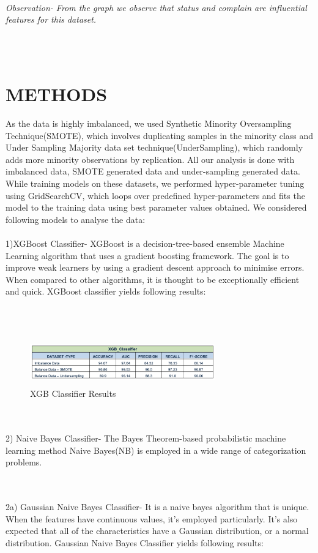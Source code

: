 \documentclass[a4paper, 10pt, conference]{ieeeconf}      %
\begin{document}
\\\textit{Observation- From the graph we observe that status and complain are influential features for this dataset.}

\\\
\section{\textbf{METHODS}}
As the data is highly imbalanced, we used Synthetic Minority Oversampling Technique(SMOTE), which involves duplicating samples in the minority class and Under Sampling Majority data set technique(UnderSampling), which randomly adds more minority observations by replication.
All our analysis is done with imbalanced data, SMOTE generated data and under-sampling generated data. While training models on these datasets, we performed hyper-parameter tuning using GridSearchCV, which loops over predefined hyper-parameters and fits the model to the training data using best parameter values obtained.
We considered following models to analyse the data:
\\\
\\1)XGBoost Classifier-
XGBoost is a decision-tree-based ensemble Machine Learning algorithm that uses a gradient boosting framework. The goal is to improve weak learners by using a gradient descent approach to minimise errors. When compared to other algorithms, it is thought to be exceptionally efficient and quick. 
XGBoost classifier yields following results:

\\\
\begin{figure}[htp]
    \centering
    \includegraphics[width=8cm,height=2cm]{Images/xgbclassifier.png}
    \caption{XGB Classifier Results}
    \label{fig:xgbclassifier}
\end{figure}
\\\
\\2) Naive Bayes Classifier- The Bayes Theorem-based probabilistic machine learning method Naive Bayes(NB) is employed in a wide range of categorization problems.

\\\
\\2a) Gaussian Naive Bayes Classifier- It is a naive bayes algorithm that is unique. When the features have continuous values, it's employed particularly. It's also expected that all of the characteristics have a Gaussian distribution, or a normal distribution.
Gaussian Naive Bayes Classifier yields following results:
\end{document}
